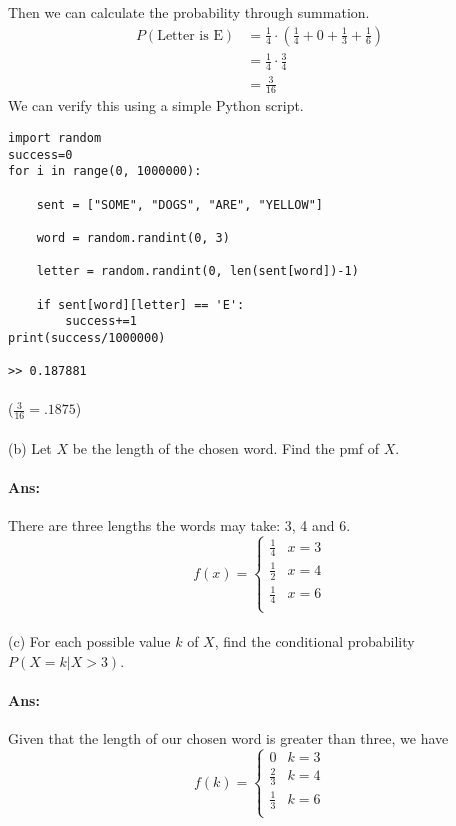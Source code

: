 \documentclass{article}
\begin{document}
\begin{enumerate}
Then we can calculate the probability through summation. 
\begin{align*}
    P(\text{Letter is E}) &= \frac{1}{4} \cdot (\frac{1}{4}+0+\frac{1}{3}+\frac{1}{6})\\
                          &= \frac{1}{4} \cdot \frac{3}{4}\\
                          &= \frac{3}{16}
\end{align*}
We can verify this using a simple Python script.
\begin{verbatim}
import random
success=0
for i in range(0, 1000000):

    sent = ["SOME", "DOGS", "ARE", "YELLOW"]

    word = random.randint(0, 3)

    letter = random.randint(0, len(sent[word])-1)

    if sent[word][letter] == 'E':
        success+=1
print(success/1000000)

>> 0.187881
\end{verbatim}
\paragraph{}($\frac{3}{16} = .1875$)
\paragraph{}(b) Let $X$ be the length of the chosen word. Find the pmf of $X$.
\paragraph{Ans:} There are three lengths the words may take: 3, 4 and 6. 
\[ f(x) = \begin{cases}
    \frac{1}{4} & x = 3 \\
    \frac{1}{2}  & x = 4\\
    \frac{1}{4}   & x = 6\\
    \end{cases}
\]
\paragraph{}(c) For each possible value $k$ of $X$, find the conditional probability $P(X = k|X > 3)$.
\paragraph{Ans:}Given that the length of our chosen word is greater than three, we have
\[ f(k) = \begin{cases}
    0 & k = 3 \\
    \frac{2}{3} & k = 4 \\
    \frac{1}{3} & k = 6 \\
    \end{cases}
\]

\end{enumerate}
\end{document}
